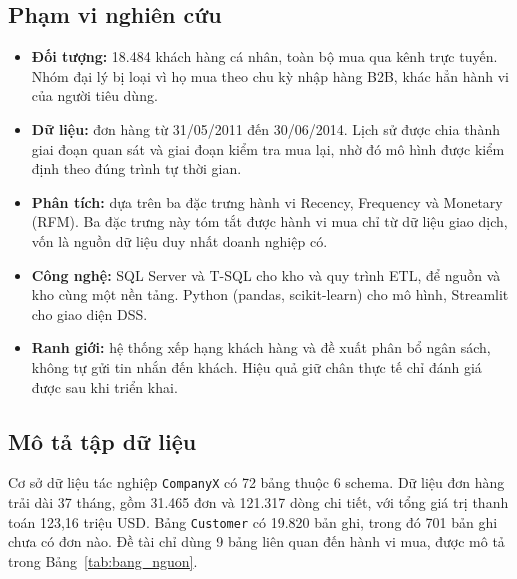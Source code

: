 \subsection{Phạm vi nghiên cứu}
\begin{itemize}
    \item \textbf{Đối tượng:} 18.484 khách hàng cá nhân, toàn bộ mua qua kênh trực tuyến. Nhóm đại lý bị loại vì họ mua theo chu kỳ nhập hàng B2B, khác hẳn hành vi của người tiêu dùng.
    \item \textbf{Dữ liệu:} đơn hàng từ 31/05/2011 đến 30/06/2014. Lịch sử được chia thành giai đoạn quan sát và giai đoạn kiểm tra mua lại, nhờ đó mô hình được kiểm định theo đúng trình tự thời gian.
    \item \textbf{Phân tích:} dựa trên ba đặc trưng hành vi Recency, Frequency và Monetary (RFM). Ba đặc trưng này tóm tắt được hành vi mua chỉ từ dữ liệu giao dịch, vốn là nguồn dữ liệu duy nhất doanh nghiệp có.
    \item \textbf{Công nghệ:} SQL Server và T-SQL cho kho và quy trình ETL, để nguồn và kho cùng một nền tảng. Python (pandas, scikit-learn) cho mô hình, Streamlit cho giao diện DSS.
    \item \textbf{Ranh giới:} hệ thống xếp hạng khách hàng và đề xuất phân bổ ngân sách, không tự gửi tin nhắn đến khách. Hiệu quả giữ chân thực tế chỉ đánh giá được sau khi triển khai.
\end{itemize}

\subsection{Mô tả tập dữ liệu}
Cơ sở dữ liệu tác nghiệp \texttt{CompanyX} có 72 bảng thuộc 6 schema. Dữ liệu đơn hàng trải dài 37 tháng, gồm 31.465 đơn và 121.317 dòng chi tiết, với tổng giá trị thanh toán 123,16 triệu USD. Bảng \texttt{Customer} có 19.820 bản ghi, trong đó 701 bản ghi chưa có đơn nào. Đề tài chỉ dùng 9 bảng liên quan đến hành vi mua, được mô tả trong Bảng~\ref{tab:bang_nguon}.

